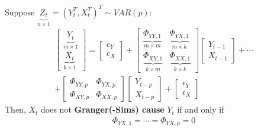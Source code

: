 \documentclass[11pt]{elegantbook}
\begin{document}
\begin{theorem}
    Suppose $\underbrace{Z_t}_{n\times 1}=\left(Y_t^T,X_t^T\right)^T\sim VAR(p)$:
    \begin{equation}
        \begin{aligned}
            \begin{bmatrix}
                \underbrace{Y_t}_{m\times 1}\\
                \underbrace{X_t}_{k\times 1}
            \end{bmatrix}
            =
            \begin{bmatrix}
                c_Y\\
                c_X
            \end{bmatrix}
            +
            \begin{bmatrix}
                \underbrace{\Phi_{YY,1}}_{m\times m}&  \underbrace{\Phi_{YX,1}}_{m\times k}\\
                \underbrace{\Phi_{XY,1}}_{k\times m}& \underbrace{\Phi_{XX,1}}_{k\times k}
            \end{bmatrix}
            \begin{bmatrix}
                Y_{t-1}\\
                X_{t-1}
            \end{bmatrix}
            +\cdots\\
            +
            \begin{bmatrix}
                \Phi_{YY,p}& \Phi_{YX,p}\\
                \Phi_{XY,p}& \Phi_{XX,p}
            \end{bmatrix}
            \begin{bmatrix}
                Y_{t-p}\\
                X_{t-p}
            \end{bmatrix}
            +
            \begin{bmatrix}
                \epsilon_Y\\
                \epsilon_X
            \end{bmatrix}
        \end{aligned}
        \nonumber
    \end{equation}
    Then, $X_t$ does not \textbf{Granger(-Sims) cause} $Y_t$ if and only if
    \begin{equation}
        \begin{aligned}
            \Phi_{YX,1}=\cdots=\Phi_{YX,p}=0
        \end{aligned}
        \nonumber
    \end{equation}
\end{theorem}
\end{document}
